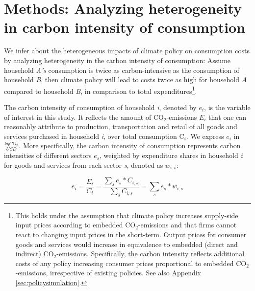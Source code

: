 \documentclass[12pt, a4paper]{article}
\begin{document}
\section{Methods: Analyzing heterogeneity in carbon intensity of consumption} \label{sec:methods}

We infer about the heterogeneous impacts of climate policy on consumption costs by analyzing heterogeneity in the carbon intensity of consumption: Assume household \textit{A's} consumption is twice as carbon-intensive as the consumption of household \textit{B}, then climate policy will lead to costs twice as high for household \textit{A} compared to household \textit{B}, in comparison to total expenditures\footnote{This holds under the assumption that climate policy increases supply-side input prices according to embedded CO$_{2}$-emissions and that firms cannot react to changing input prices in the short-term. Output prices for consumer goods and services would increase in equivalence to embedded (direct and indirect) CO$_{2}$-emissions. Specifically, the carbon intensity reflects additional costs of any policy increasing consumer prices proportional to embedded CO$_{2}$-emissions, irrespective of existing policies. See also Appendix \ref{sec:policysimulation}.}.

The carbon intensity of consumption of household \textit{i}, denoted by $e_{i}$, is the variable of interest in this study. It reflects the amount of CO$_{2}$-emissions $E_{i}$ that one can reasonably attribute to production, transportation and retail of all goods and services purchased in household \textit{i}, over total consumption C$_{i}$. We express $e_{i}$ in $\frac{kgCO_{2}}{USD}$. More specifically, the carbon intensity of consumption represents carbon intensities of different sectors $e_{s}$, weighted by expenditure shares in household \textit{i} for goods and services from each sector \textit{s}, denoted as $w_{i,s}$:


\begin{equation} \label{eq:ei}
e_{i} = \frac{E_{i}}{C_{i}} = \frac{\sum_{s} e_{s}*C_{i,s}}{\sum_{s} C_{i,s}} = \sum_{s} e_{s}*w_{i,s}
\end{equation}

\end{document}
